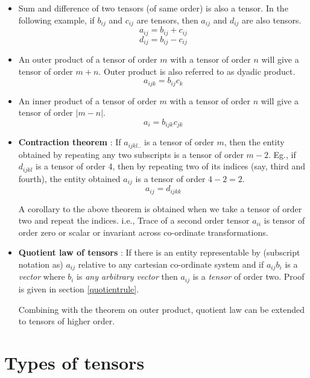 \begin{itemize}

\item Sum and difference of two tensors (of same order) is also a tensor. In the following example, if $b_{ij}$ and $c_{ij}$ are tensors, then $a_{ij}$ and $d_{ij}$ are also tensors.
$$ a_{ij} = b_{ij} + c_{ij} $$
$$ d_{ij} = b_{ij} - c_{ij} $$

\item An outer product of a tensor of order $m$  with a tensor of order $n$ will give a tensor of order $m+n$. Outer product is also referred to as dyadic product.
$$a_{ijk} = b_{ij}c_{k}$$

\item An inner product of a tensor of order $m$ with a tensor of order $n$ will give a tensor of order $|m-n|$.
$$a_{i} = b_{ijk}c_{jk}$$

\item {\bf Contraction theorem}\label{contraction}  : If $a_{ijkl..}$ is a tensor of order $m$, then the entity obtained by repeating any two subscripts is a tensor of order $m-2$. Eg., if $d_{ijkl}$ is a tensor of order 4, then by repeating two of its indices (say, third and fourth), the entity obtained $a_{ij}$ is a tensor of order $4-2=2$.
$$ a_{ij} = d_{ijkk}$$


A corollary to the above theorem is obtained when we take a tensor of order two and repeat the indices. i.e., Trace of a second order tensor $a_{ii}$ is tensor of order zero or scalar or invariant across co-ordinate transformations.


\item {\bf Quotient law of tensors} : If there is an entity representable by (subscript notation as) $a_{ij}$ relative to any cartesian co-ordinate system and if $a_{ij}b_i$ is a {\em vector} where $b_i$ is {\em any arbitrary vector} then $a_{ij}$ is a {\em tensor} of order two. Proof is given in section \ref{quotientrule}.

Combining with the theorem on outer product, quotient law can be extended to tensors of higher order.


\end{itemize}


\section{Types of tensors}

